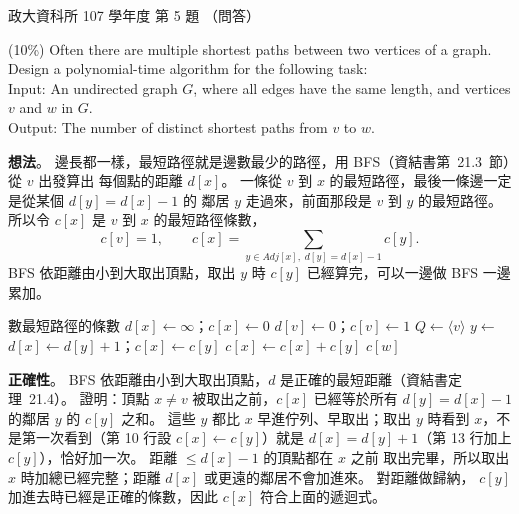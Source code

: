\begin{pastexam}[label={px:nccu-107-dsa-05}]{政大資科所 107 學年度 第 5 題}
（問答）

(10\%) Often there are multiple shortest paths between two vertices of a graph. Design a
polynomial-time algorithm for the following task:\\
Input: An undirected graph $G$, where all edges have the same length, and vertices $v$ and $w$ in
$G$.\\
Output: The number of distinct shortest paths from $v$ to $w$.
\end{pastexam}

\begin{pastsoln}
\textbf{想法}。 邊長都一樣，最短路徑就是邊數最少的路徑，用 BFS（資結書第~21.3~節）從 $v$ 出發算出
每個點的距離 $d[x]$。 一條從 $v$ 到 $x$ 的最短路徑，最後一條邊一定是從某個 $d[y] = d[x] - 1$ 的
鄰居 $y$ 走過來，前面那段是 $v$ 到 $y$ 的最短路徑。 所以令 $c[x]$ 是 $v$ 到 $x$ 的最短路徑條數，
\[
c[v] = 1, \qquad c[x] = \sum_{y \in \mathit{Adj}[x],\; d[y] = d[x] - 1} c[y].
\]
BFS 依距離由小到大取出頂點，取出 $y$ 時 $c[y]$ 已經算完，可以一邊做 BFS 一邊累加。

\begin{pseudo}{數最短路徑的條數}
        \State $d[x] \gets \infty$；$c[x] \gets 0$
    \EndFor
    \State $d[v] \gets 0$；$c[v] \gets 1$
    \State $Q \gets \langle v \rangle$
        \State $y \gets$ 
             
                \State $d[x] \gets d[y] + 1$；$c[x] \gets c[y]$
                \State {}
             
                \State $c[x] \gets c[x] + c[y]$
            \EndIf
        \EndFor
    \EndWhile
    \State \Return $c[w]$ 
\EndFunction
\end{pseudo}

\textbf{正確性}。 BFS 依距離由小到大取出頂點，$d$ 是正確的最短距離（資結書定理~21.4）。 證明：頂點
$x \ne v$ 被取出之前，$c[x]$ 已經等於所有 $d[y] = d[x] - 1$ 的鄰居 $y$ 的 $c[y]$ 之和。 這些 $y$ 都比
$x$ 早進佇列、早取出；取出 $y$ 時看到 $x$，不是第一次看到（第 10 行設 $c[x] \gets c[y]$）就是
$d[x] = d[y] + 1$（第 13 行加上 $c[y]$），恰好加一次。 距離 $\le d[x] - 1$ 的頂點都在 $x$ 之前
取出完畢，所以取出 $x$ 時加總已經完整；距離 $d[x]$ 或更遠的鄰居不會加進來。 對距離做歸納，
$c[y]$ 加進去時已經是正確的條數，因此 $c[x]$ 符合上面的遞迴式。


\end{pastsoln}
